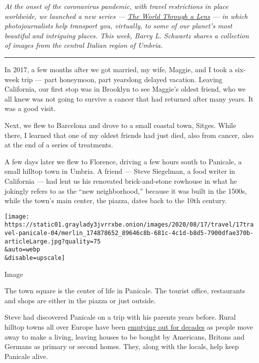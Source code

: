 \emph{At the onset of the coronavirus pandemic, with travel restrictions
in place worldwide, we launched a new series ---}
\href{https://www.nytimes3xbfgragh.onion/column/the-world-through-a-lens}{\emph{The
World Through a Lens}} \emph{--- in which photojournalists help
transport you, virtually, to some of our planet's most beautiful and
intriguing places. This week, Barry L. Schwartz shares a collection of
images from the central Italian region of Umbria.}

\begin{center}\rule{0.5\linewidth}{\linethickness}\end{center}

In 2017, a few months after we got married, my wife, Maggie, and I took
a six-week trip --- part honeymoon, part yearslong delayed vacation.
Leaving California, our first stop was in Brooklyn to see Maggie's
oldest friend, who we all knew was not going to survive a cancer that
had returned after many years. It was a good visit.

Next, we flew to Barcelona and drove to a small coastal town, Sitges.
While there, I learned that one of my oldest friends had just died, also
from cancer, also at the end of a series of treatments.

A few days later we flew to Florence, driving a few hours south to
Panicale, a small hilltop town in Umbria. A friend --- Steve Siegelman,
a food writer in California --- had lent us his renovated
brick-and-stone rowhouse in what he jokingly refers to as the ``new
neighborhood,'' because it was built in the 1500s, while the town's main
center, the piazza, dates back to the 10th century.

\texttt{[image: https://static01.graylady3jvrrxbe.onion/images/2020/08/17/travel/17travel-panicale-04/merlin\_174878652\_89646c8b-681c-4c1d-b8d5-7900dfae370b-articleLarge.jpg?quality=75\\\&auto=webp\\\&disable=upscale]}

Image

The town square is the center of life in Panicale. The tourist office,
restaurants and shops are either in the piazza or just outside.

Steve had discovered Panicale on a trip with his parents years before.
Rural hilltop towns all over Europe have been
\href{https://www.nytimes3xbfgragh.onion/2017/09/07/t-magazine/abandoned-italian-towns.html}{emptying
out for decades} as people move away to make a living, leaving houses to
be bought by Americans, Britons and Germans as primary or second homes.
They, along with the locals, help keep Panicale alive.

